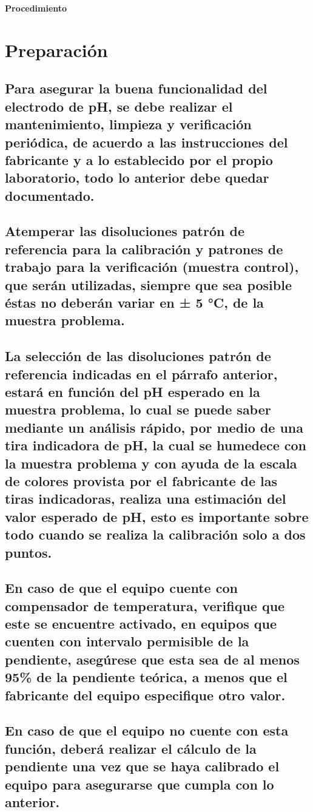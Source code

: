 \documentclass[spanish,12pt,letterpaper,titlepage]{article}
\theoremstyle{definition}
\begin{document}
	\pagestyle{fancy}
	\noindent\Large{\textbf{Procedimiento}}
	\normalsize
	\section{Preparación}\label{9.1}
	\subsection{Para asegurar la buena funcionalidad del electrodo de pH, se debe realizar el mantenimiento, limpieza y verificación periódica, de acuerdo a las instrucciones del fabricante y a lo establecido por el propio laboratorio, todo lo anterior debe quedar documentado.}\label{9.1.1}
	\subsection{Atemperar las disoluciones patrón de referencia para la calibración y patrones de trabajo para la verificación (muestra control), que serán utilizadas, siempre que sea posible éstas no deberán variar en ± 5 °C, de la muestra problema.}\label{9.1.2}
	\subsection{La selección de las disoluciones patrón de referencia indicadas en el párrafo anterior, estará en función del pH esperado en la muestra problema, lo cual se puede saber mediante un análisis rápido, por medio de una tira indicadora de pH, la cual se humedece con la muestra problema y con ayuda de la escala de colores provista por el fabricante de las tiras indicadoras, realiza una estimación del valor esperado de pH, esto es importante sobre todo cuando se realiza la calibración solo a dos puntos.}\label{9.1.3}
	\subsection{En caso de que el equipo cuente con compensador de temperatura, verifique que este se encuentre activado, en equipos que cuenten con intervalo permisible de la pendiente, asegúrese que esta sea de al menos 95\% de la pendiente teórica, a menos que el fabricante del equipo especifique otro valor.}\label{9.1.4}
 	\subsection{En caso de que el equipo no cuente con esta función, deberá realizar el cálculo de la pendiente una vez que se haya calibrado el equipo para asegurarse que cumpla con lo anterior.}\label{9.1.5}
\end{document}

